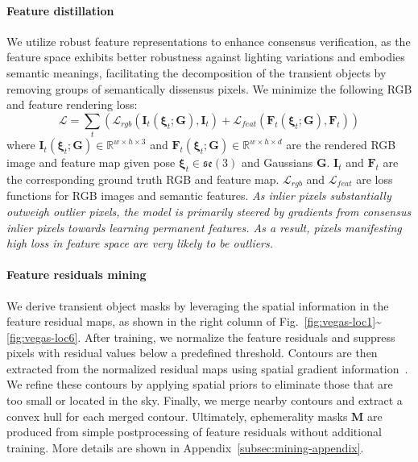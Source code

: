 \paragraph{Feature distillation}
We utilize robust feature representations to enhance consensus verification, as the feature space exhibits better robustness against lighting variations and embodies semantic meanings, facilitating the decomposition of the transient objects by removing groups of semantically dissensus pixels.  We minimize the following RGB and feature rendering loss:
\begin{equation}
\mathcal{L} = \sum_t (\mathcal{L}_{rgb} ( \mathbf{I}_t(\boldsymbol{\xi}_t;\mathbf{G}) , \mathbf{I}_t ) + \mathcal{L}_{feat} ( \mathbf{F}_t(\boldsymbol{\xi}_t;\mathbf{G}) , \mathbf{F}_t ))
\end{equation}
where $\mathbf{I}_t(\boldsymbol{\xi}_t; \mathbf{G}) \in \mathbb{R}^{w\times h\times 3}$ and $\mathbf{F}_t(\boldsymbol{\xi}_t; \mathbf{G}) \in \mathbb{R}^{w\times h\times d}$ are the rendered RGB image and feature map given pose $\boldsymbol{\xi}_t \in \mathfrak{se}(3)$ and Gaussians $\mathbf{G}$. $\mathbf{I}_t$ and $\mathbf{F}_t$ are the corresponding ground truth RGB and feature map. $\mathcal{L}_{rgb}$ and $\mathcal{L}_{feat}$ are loss functions for RGB images and semantic features. \textit{As inlier pixels substantially outweigh outlier pixels, the model is primarily steered by gradients from consensus inlier pixels towards learning permanent features. As a result, pixels manifesting high loss in feature space are very likely to be outliers.}


\paragraph{Feature residuals mining} We derive transient object masks by leveraging the spatial information in the feature residual maps, as shown in the right column of Fig.~\ref{fig:vegas-loc1}\textasciitilde\ref{fig:vegas-loc6}. After training, we normalize the feature residuals and suppress pixels with residual values below a predefined threshold. Contours are then extracted from the normalized residual maps using spatial gradient information~\cite{suzuki1985topological}. We refine these contours by applying spatial priors to eliminate those that are too small or located in the sky. Finally, we merge nearby contours and extract a convex hull for each merged contour. Ultimately, ephemerality masks $\mathbf{M}$ are produced from simple postprocessing of feature residuals without additional training. More details are shown in Appendix~\ref{subsec:mining-appendix}.


